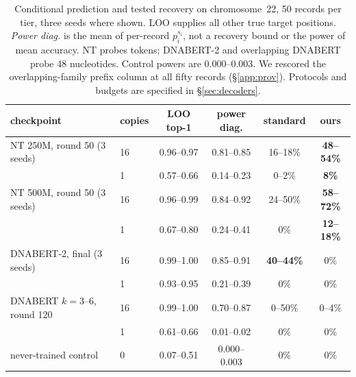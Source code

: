 \begin{table}[tbp]
\centering
\caption{Conditional prediction and tested recovery on chromosome~22, 50 records per tier,
three seeds where shown. LOO supplies all other true target positions. \emph{Power diag.}
is the mean of per-record $p_i^{s_i}$, not a recovery bound or the power of mean accuracy.
NT probes tokens; DNABERT-2 and overlapping DNABERT probe 48 nucleotides. Control powers
are $0.000$--$0.003$. We rescored the overlapping-family prefix column at all fifty
records (\S\ref{app:prov}). Protocols and budgets are specified in \S\ref{sec:decoders}.}
\label{tab:loo}
\begin{tabular}{llcccc}
\toprule
checkpoint & copies & LOO top-1 & power diag. & standard & ours \\
\midrule
NT 250M, round 50 (3 seeds) & 16 & 0.96--0.97 & 0.81--0.85 & 16--18\% & \textbf{48--54\%} \\
                       & 1  & 0.57--0.66 & 0.14--0.23 & 0--2\%   & \textbf{8\%}  \\
NT 500M, round 50 (3 seeds) & 16 & 0.96--0.99 & 0.84--0.92 & 24--50\% & \textbf{58--72\%} \\
                       & 1  & 0.67--0.80 & 0.24--0.41 & 0\%      & \textbf{12--18\%} \\
DNABERT-2, final (3 seeds) & 16 & 0.99--1.00 & 0.85--0.91 & \textbf{40--44\%} & 0\% \\
                       & 1  & 0.93--0.95  & 0.21--0.39  & 0\%     & 0\% \\
DNABERT $k=3$--6, round 120 & 16 & 0.99--1.00 & 0.70--0.87 & 0--50\%  & 0--4\% \\
                       & 1  & 0.61--0.66  & 0.01--0.02  & 0\%     & 0\% \\
\midrule
never-trained control  & 0  & 0.07--0.51  & 0.000--0.003 & 0\%     & 0\% \\
\bottomrule
\end{tabular}
\end{table}
